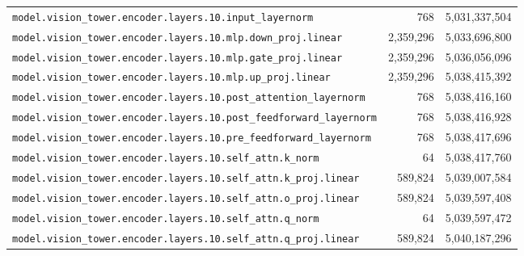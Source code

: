 \documentclass[10pt,a4paper]{article}
\theoremstyle{definition}
\begin{document}
\begin{appendices}
\begin{longtable}{p{9.5cm}rr}
\texttt{model.\allowbreak{}vision\_tower.\allowbreak{}encoder.\allowbreak{}layers.\allowbreak{}10.\allowbreak{}input\_layernorm} & 768 & 5,031,337,504 \\
\texttt{model.\allowbreak{}vision\_tower.\allowbreak{}encoder.\allowbreak{}layers.\allowbreak{}10.\allowbreak{}mlp.\allowbreak{}down\_proj.\allowbreak{}linear} & 2,359,296 & 5,033,696,800 \\
\texttt{model.\allowbreak{}vision\_tower.\allowbreak{}encoder.\allowbreak{}layers.\allowbreak{}10.\allowbreak{}mlp.\allowbreak{}gate\_proj.\allowbreak{}linear} & 2,359,296 & 5,036,056,096 \\
\texttt{model.\allowbreak{}vision\_tower.\allowbreak{}encoder.\allowbreak{}layers.\allowbreak{}10.\allowbreak{}mlp.\allowbreak{}up\_proj.\allowbreak{}linear} & 2,359,296 & 5,038,415,392 \\
\texttt{model.\allowbreak{}vision\_tower.\allowbreak{}encoder.\allowbreak{}layers.\allowbreak{}10.\allowbreak{}post\_attention\_layernorm} & 768 & 5,038,416,160 \\
\texttt{model.\allowbreak{}vision\_tower.\allowbreak{}encoder.\allowbreak{}layers.\allowbreak{}10.\allowbreak{}post\_feedforward\_layernorm} & 768 & 5,038,416,928 \\
\texttt{model.\allowbreak{}vision\_tower.\allowbreak{}encoder.\allowbreak{}layers.\allowbreak{}10.\allowbreak{}pre\_feedforward\_layernorm} & 768 & 5,038,417,696 \\
\texttt{model.\allowbreak{}vision\_tower.\allowbreak{}encoder.\allowbreak{}layers.\allowbreak{}10.\allowbreak{}self\_attn.\allowbreak{}k\_norm} & 64 & 5,038,417,760 \\
\texttt{model.\allowbreak{}vision\_tower.\allowbreak{}encoder.\allowbreak{}layers.\allowbreak{}10.\allowbreak{}self\_attn.\allowbreak{}k\_proj.\allowbreak{}linear} & 589,824 & 5,039,007,584 \\
\texttt{model.\allowbreak{}vision\_tower.\allowbreak{}encoder.\allowbreak{}layers.\allowbreak{}10.\allowbreak{}self\_attn.\allowbreak{}o\_proj.\allowbreak{}linear} & 589,824 & 5,039,597,408 \\
\texttt{model.\allowbreak{}vision\_tower.\allowbreak{}encoder.\allowbreak{}layers.\allowbreak{}10.\allowbreak{}self\_attn.\allowbreak{}q\_norm} & 64 & 5,039,597,472 \\
\texttt{model.\allowbreak{}vision\_tower.\allowbreak{}encoder.\allowbreak{}layers.\allowbreak{}10.\allowbreak{}self\_attn.\allowbreak{}q\_proj.\allowbreak{}linear} & 589,824 & 5,040,187,296 \\

\end{longtable}
\end{appendices}
\end{document}
